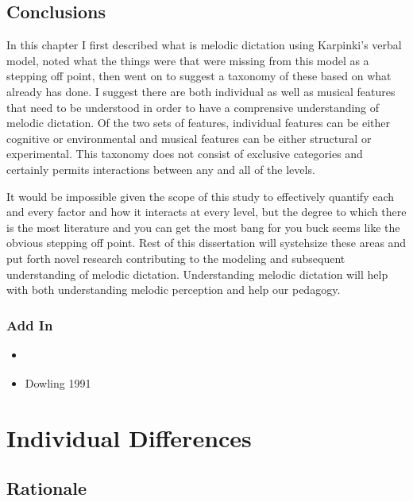 \documentclass[]{book}
\providecommand{\tightlist}{%
  \setlength{\itemsep}{0pt}\setlength{\parskip}{0pt}}
\begin{document}
\hypertarget{conclusions}{%
\section{Conclusions}\label{conclusions}}

In this chapter I first described what is melodic dictation using Karpinki's verbal model, noted what the things were that were missing from this model as a stepping off point, then went on to suggest a taxonomy of these based on what already has done.
I suggest there are both individual as well as musical features that need to be understood in order to have a comprensive understanding of melodic dictation.
Of the two sets of features, individual features can be either cognitive or environmental and musical features can be either structural or experimental.
This taxonomy does not consist of exclusive categories and certainly permits interactions between any and all of the levels.

It would be impossible given the scope of this study to effectively quantify each and every factor and how it interacts at every level, but the degree to which there is the most literature and you can get the most bang for you buck seems like the obvious stepping off point.
Rest of this dissertation will systehsize these areas and put forth novel research contributing to the modeling and subsequent understanding of melodic dictation.
Understanding melodic dictation will help with both understanding melodic perception and help our pedagogy.

\hypertarget{add-in}{%
\subsection{Add In}\label{add-in}}

\begin{itemize}
\tightlist
\item
  \citep{hansenWorkingMemoryMusical2013}
\item
  Dowling 1991 \citep{dowlingTonalStrengthMelody1991}
\end{itemize}

\hypertarget{individual-differences}{%
\chapter{Individual Differences}\label{individual-differences}}

\hypertarget{rationale}{%
\section{Rationale}\label{rationale}}
\end{document}
